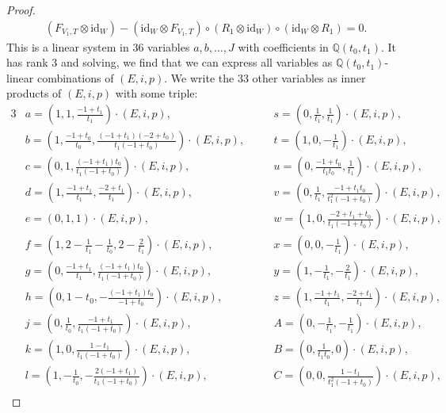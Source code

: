 \documentclass[10pt,a4paper]{amsart}
\numberwithin{equation}{section}
\theoremstyle{definition}
\begin{document}
\begin{proof}
\begin{gather*}
( F_{V_1,T} \otimes \text{id}_W) - (\text{id}_W \otimes F_{V_1,T})
\circ (R_1 \otimes \text{id}_W) \circ (\text{id}_W \otimes R_1) = 0 .
\end{gather*}
This is a linear system in $36$ variables $a,b,\dots,J$ with coefficients
in $\mathbb{Q}(t_0,t_1)$. It has rank $3$ and solving, we find that we can express
all variables as $\mathbb{Q}(t_0,t_1)$-linear combinations of $(E,i,p)$. We write the 33 other variables as inner products of $(E,i,p)$ with some triple:
\begin{alignat*}{3}
& a = \left( 1, 1, \frac{-1+t_1}{t_1} \right) \cdot (E,i,p) ,\qquad &&
s = \left(0, \frac{1}{t_1}, \frac{1}{t_1} \right) \cdot (E,i,p) ,&\\
&b = \left(1, \frac{-1+t_0}{t_0}, \frac{(-1+t_1)(-2+t_0)}{t_1(-1+t_0)}\right) \cdot (E,i,p) ,\quad &&
t = \left(1, 0, -\frac{1}{t_1}\right) \cdot (E,i,p) ,& \\
&c = \left(0, 1, \frac{(-1+t_1)t_0}{t_1(-1+t_0)}\right) \cdot (E,i,p) ,\qquad &&
u = \left(0, \frac{-1+t_0}{t_1 t_0}, \frac{1}{t_1}\right) \cdot (E,i,p) ,&\\
&d = \left(1, \frac{-1+t_1}{t_1}, \frac{-2+t_1}{t_1}\right) \cdot (E,i,p) ,\qquad &&
v = \left(0, \frac{1}{t_1}, \frac{-1+t_1 t_0}{t_1^2(-1+t_0)}\right) \cdot (E,i,p) ,&\\
&e = ( 0, 1, 1 ) \cdot (E,i,p) ,\qquad &&
w = \left(1, 0, \frac{-2+t_1+t_0}{t_1(-1+t_0)} \right) \cdot (E,i,p) ,&\\
&f = \left(1, 2 - \frac{1}{t_1} - \frac{1}{t_0}, 2 - \frac{2}{t_1} \right) \cdot (E,i,p) ,\qquad &&
x = \left(0, 0, -\frac{1}{t_1}\right) \cdot (E,i,p) ,&\\
&g = \left(0, \frac{-1+t_1}{t_1}, \frac{(-1+t_1)t_0}{t_1(-1+t_0)}\right) \cdot (E,i,p) ,\qquad &&
y = \left(1, -\frac{1}{t_1}, -\frac{2}{t_1}\right) \cdot (E,i,p) ,&\\
&h = \left(0, 1-t_0, -\frac{(-1+t_1)t_0}{-1+t_0}\right) \cdot (E,i,p) ,\qquad &&
z = \left(1, \frac{-1+t_1}{t_1}, \frac{-2+t_1}{t_1} \right) \cdot (E,i,p) ,& \\
&j = \left(0, \frac{1}{t_0}, \frac{-1+t_1}{t_1(-1+t_0)}\right) \cdot (E,i,p) ,\qquad &&
A = \left(0, -\frac{1}{t_1}, -\frac{1}{t_1}\right) \cdot (E,i,p) ,&\\
&k = \left(1, 0, \frac{1-t_1}{t_1(-1+t_0)} \right) \cdot (E,i,p) ,\qquad &&
B = \left(0, \frac{1}{t_1 t_0}, 0\right) \cdot (E,i,p) ,&\\
&l = \left(1, -\frac{1}{t_0}, -\frac{2(-1+t_1)}{t_1(-1+t_0)} \right) \cdot (E,i,p) ,\qquad &&
C = \left(0, 0, \frac{1-t_1}{t_1^2(-1+t_0)}\right) \cdot (E,i,p) ,& \\

\end{alignat*}
\end{proof}
\end{document}
